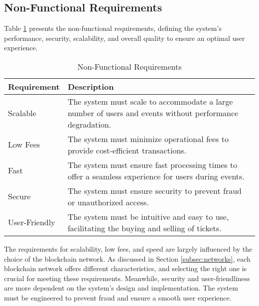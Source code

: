 \subsection{Non-Functional Requirements}
\label{subsec:non_functional_requirements}

Table \ref{tab:non_functional_requirements} presents the non-functional
requirements, defining the system's performance, security, scalability, and
overall quality to ensure an optimal user experience.

\begin{table}[H]
    \centering
    \begin{tabularx}{\textwidth}{lX}
        \hline
        \textbf{Requirement} & \textbf{Description}                                                                                     \\
        \hline
        Scalable             & The system must scale to accommodate a large number of users and events without performance degradation. \\
        \hline
        Low Fees             & The system must minimize operational fees to provide cost-efficient transactions.                        \\
        \hline
        Fast                 & The system must ensure fast processing times to offer a seamless experience for users during events.     \\
        \hline
        Secure               & The system must ensure security to prevent fraud or unauthorized access.                                 \\
        \hline
        User-Friendly        & The system must be intuitive and easy to use, facilitating the buying and selling of tickets.            \\
        \hline
    \end{tabularx}
    \caption{Non-Functional Requirements}
    \label{tab:non_functional_requirements}
\end{table}

The requirements for scalability, low fees, and speed are largely influenced by
the choice of the blockchain network. As discussed in Section
\ref{subsec:networks}, each blockchain network offers different
characteristics, and selecting the right one is crucial for meeting these
requirements. Meanwhile, security and user-friendliness are more dependent on
the system's design and implementation. The system must be engineered to
prevent fraud and ensure a smooth user experience.
